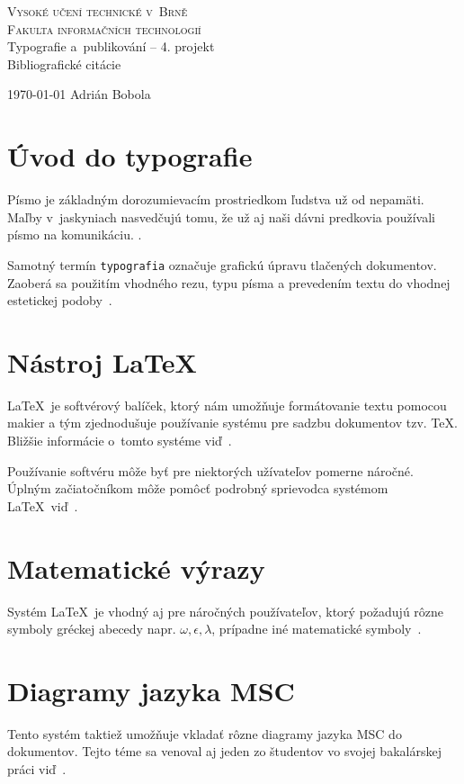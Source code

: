 \documentclass[11pt,a4paper]{article}
\begin{document}
\begin{titlepage}
\begin{center}
\Huge\textsc{Vysoké učení technické v~Brně}\\
\huge\textsc{Fakulta informačních technologií}\\
\LARGE{Typografie a~publikování -- 4. projekt}\\
\Huge{Bibliografické citácie}
\end{center}
{\Large{\today\hfill
Adrián Bobola}}
\end{titlepage}

\section*{Úvod do typografie}
    Písmo je základným dorozumievacím prostriedkom ľudstva už od nepamäti. Maľby v~jaskyniach
    nasvedčujú tomu, že už aj naši dávni predkovia používali písmo na
    komunikáciu.\cite{Printmag}
    \cite{typografia_1976}.
    
    Samotný termín \verb|typografia| označuje grafickú úpravu tlačených dokumentov.
    Zaoberá sa použitím vhodného rezu, typu písma a prevedením textu do vhodnej estetickej
    podoby~\cite{Fiala}.
    
\section*{Nástroj \LaTeX}    
  \LaTeX\ je softvérový balíček, ktorý nám umožňuje formátovanie textu pomocou makier a tým zjednodušuje používanie systému pre sadzbu dokumentov tzv. TeX. Bližšie informácie o~tomto systéme viď~\cite{wiki_tex}.
  
  Používanie softvéru môže byť pre niektorých užívateľov pomerne náročné. 
  Úplným začiatočníkom môže pomôcť podrobný sprievodca systémom \LaTeX\
  viď~\cite{Kopka}. 
  
\section{Matematické výrazy}
Systém \LaTeX\ je vhodný aj pre náročných používateľov, ktorý požadujú
rôzne symboly gréckej abecedy napr. $\omega, \epsilon, \lambda$, prípadne iné matematické symboly~\cite{Gratzer}. 

\section{Diagramy jazyka MSC}
Tento systém taktiež umožňuje vkladať rôzne diagramy jazyka MSC do dokumentov. Tejto téme sa venoval aj jeden zo študentov vo svojej bakalárskej práci viď~\cite{Fabry}.
\end{document}
